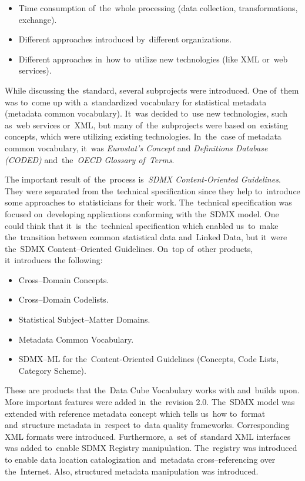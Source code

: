 \begin{itemize}
\item Time consumption of~the~whole processing (data collection, transformations, 
exchange).
\item Different approaches introduced by~different organizations.
\item Different approaches in~how to~utilize new technologies (like XML or~web 
services).
\end{itemize}

While discussing the~standard, several subprojects were introduced. One of~them was to~come
up with a~standardized vocabulary for statistical metadata (metadata common vocabulary). It~was
decided to~use new technologies, such as~web services or~XML, but many of~the~subprojects
were based on~existing concepts, which were utilizing existing technologies. In~the~case of
metadata common vocabulary, it~was \emph{Eurostat’s Concept} and
\emph{Definitions Database (CODED)} and~the~\emph{OECD Glossary of~Terms}.

The important result of~the~process is~\emph{SDMX Content-Oriented Guidelines}.
They were separated
from the~technical specification since they help to~introduce some approaches to~statisticians
for their work. The~technical specification was focused on~developing applications
conforming with the~SDMX model. One could think that it~is~the~technical specification
which enabled us~to~make the~transition between common statistical data and~Linked Data,
but it~were the~SDMX Content--Oriented Guidelines. On~top of~other products, it~introduces the
following:

\begin{itemize}
\item Cross--Domain Concepts.
\item Cross--Domain Codelists.
\item Statistical Subject--Matter Domains.
\item Metadata Common Vocabulary.
\item SDMX--ML for the~Content-Oriented Guidelines (Concepts, Code Lists, Category 
Scheme).
\end{itemize}

These are products that the~Data Cube Vocabulary works with and~builds upon. More important
features were added in~the~revision 2.0. The~SDMX model was extended with reference metadata
concept which tells us~how to~format and~structure metadata in~respect to~data quality
frameworks. Corresponding XML formats were introduced. Furthermore, a~set of~standard XML
interfaces was added to~enable SDMX Registry manipulation. The~registry was introduced to
enable data location catalogization and~metadata cross--referencing over the~Internet. Also,
structured metadata manipulation was introduced.

